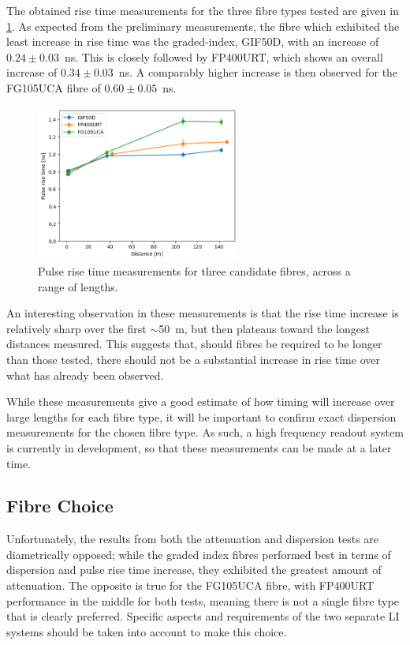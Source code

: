 \documentclass[a4paper,11pt]{article}
\let\oldsim\sim
\renewcommand{\sim}{{\oldsim}}
\begin{document}
The obtained rise time measurements for the three fibre types tested are given in \cref{fig:disprise}. As expected from the preliminary measurements, the fibre which exhibited the least increase in rise time was the graded-index, GIF50D, with an increase of $0.24\pm0.03$~ns. This is closely followed by FP400URT, which shows an overall increase of $0.34\pm0.03$~ns. A comparably higher increase is then observed for the FG105UCA fibre of $0.60\pm0.05$~ns.
\begin{figure}[h]
\centering
\includegraphics[width=0.6\textwidth]{RiseTimeOct24_zero.png}
\caption{Pulse rise time measurements for three candidate fibres, across a range of lengths.}\label{fig:disprise}
\end{figure}
An interesting observation in these measurements is that the rise time increase is relatively sharp over the first $\sim$50~m, but then plateaus toward the longest distances measured. This suggests that, should fibres be required to be longer than those tested, there should not be a substantial increase in rise time over what has already been observed.

While these measurements give a good estimate of how timing will increase over large lengths for each fibre type, it will be important to confirm exact dispersion measurements for the chosen fibre type. As such, a high frequency readout system is currently in development, so that these measurements can be made at a later time.

\subsection{Fibre Choice}\label{sec:fibre:sub:choice}

Unfortunately, the results from both the attenuation and dispersion tests are diametrically opposed; while the graded index fibres performed best in terms of dispersion and pulse rise time increase, they exhibited the greatest amount of attenuation. The opposite is true for the FG105UCA fibre, with FP400URT performance in the middle for both tests, meaning there is not a single fibre type that is clearly preferred. Specific aspects and requirements of the two separate LI systems should be taken into account to make this choice.
\end{document}
